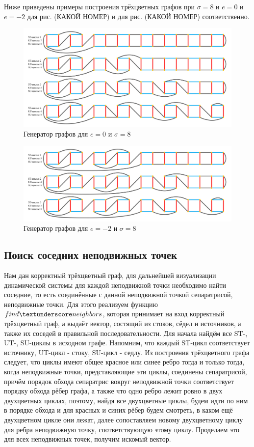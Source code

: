 	Ниже приведены примеры построения трёхцветных графов при $\sigma=8$ и $e=0$ и $e=-2$ для рис. (КАКОЙ НОМЕР) и для рис. (КАКОЙ НОМЕР) соответственно.
	\begin{figure}[h!]
	\centering
	\includegraphics[width=\textwidth]{Torus.png}
	\caption{Генератор графов для $e=0$ и $\sigma=8$ \label{overflow}}
	\end{figure}
	\begin{figure}[h!]
	\centering
	\includegraphics[width=\textwidth]{Double Torus.png}
	\caption{Генератор графов для $e=-2$ и $\sigma=8$ \label{overflow}}
	\end{figure}
	\subsection{Поиск соседних неподвижных точек}
	Нам дан корректный трёхцветный граф, для дальнейшей визуализации динамической системы для каждой неподвижной точки необходимо найти соседние, то есть соединённые с данной неподвижной точкой сепаратрисой, неподвижные точки. Для этого реализуем функцию $find \textunderscore neighbors$, которая принимает на вход корректный трёхцветный граф, а выдаёт вектор, состящий из стоков, сёдел и источников, а также их соседей в правильной последовательности.
	Для начала найдём все ST-, UT-, SU-циклы в исходном графе. Напомним, что каждый ST-цикл соответствует источнику, UT-цикл - стоку, SU-цикл - седлу. Из построения трёхцветного графа следует, что циклы имеют общее красное или синее ребро тогда и только тогда, когда неподвижные точки, представляющие эти циклы, соединены сепаратрисой, причём порядок обхода сепаратрис вокруг неподвижной точки соответствует порядку обхода рёбер графа, а также что одно ребро лежит ровно в двух двухцветных циклах, поэтому, найдя все двухцветные циклы, будем идти по ним в порядке обхода и для красных и синих рёбер будем смотреть, в каком ещё двухцветном цикле они лежат, далее сопоставляем новому двухцветному циклу для ребра неподвижную точку, соответствующую этому циклу. Проделаем это для всех неподвижных точек, получим искомый вектор.
